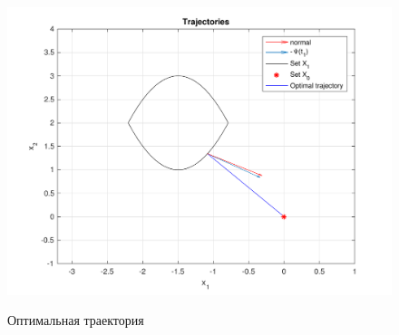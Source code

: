 \documentclass[11pt, oneside, final]{article}
\theoremstyle{break}
\numberwithin{equation}{section}
\theoremstyle{plain}
\theoremstyle{definition}
\begin{document}
    \begin{figure}[H]
            \centering
            \includegraphics[width=\linewidth]{s2fig2}
            \label{pic:s2:2}
            \caption{Оптимальная траектория}
    \end{figure}
\end{document}
